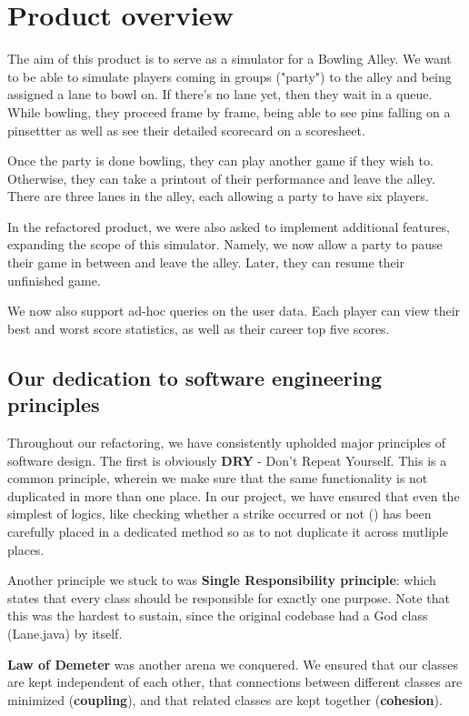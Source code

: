 \section{Product overview}

The aim of this product is to serve as a simulator for a Bowling Alley. We want to be able to simulate players coming in groups ("party") to the alley and being assigned a lane to bowl on. If there's no lane yet, then they wait in a queue. While bowling, they proceed frame by frame, being able to see pins falling on a pinsettter as well as see their detailed scorecard on a scoresheet.

Once the party is done bowling, they can play another game if they wish to. Otherwise, they can take a printout of their performance and leave the alley. There are three lanes in the alley, each allowing a party to have six players.

In the refactored product, we were also asked to implement additional features, expanding the scope of this simulator. Namely, we now allow a party to pause their game in between and leave the alley. Later, they can resume their unfinished game.

We now also support ad-hoc queries on the user data. Each player can view their best and worst score statistics, as well as their career top five scores.

\subsection{Our dedication to software engineering principles}

Throughout our refactoring, we have consistently upholded major principles of software design. The first is obviously \textbf{DRY} - Don't Repeat Yourself. This is a common principle, wherein we make sure that the same functionality is not duplicated in more than one place. In our project, we have ensured that even the simplest of logics, like checking whether a strike occurred or not () has been carefully placed in a dedicated method so as to not duplicate it across mutliple places.

Another principle we stuck to was \textbf{Single Responsibility principle}: which states that every class should be responsible for exactly one purpose. Note that this was the hardest to sustain, since the original codebase had a God class (Lane.java) by itself.

\textbf{Law of Demeter} was another arena we conquered. We ensured that our classes are kept independent of each other, that connections between different classes are minimized (\textbf{coupling}), and that related classes are kept together (\textbf{cohesion}).

